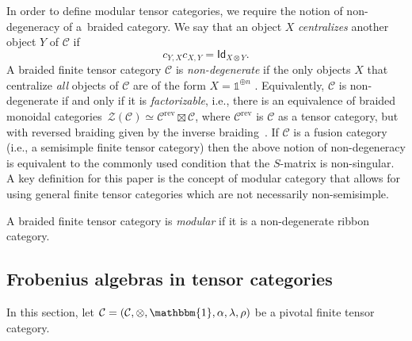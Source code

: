 \documentclass[10pt,a4paper]{amsart}
\numberwithin{equation}{section}
\newcommand{\ide}{\mathsf{Id}}
\newcommand{\one}{\mathds{1}}
\newcommand{\rev}{\mathrm{rev}}
\newcommand{\cC}{\mathcal{C}}
\newcommand{\cZ}{\mathcal{Z}}
\begin{document}
In order to define modular tensor categories, we require the notion of non-degeneracy of a~braided category. We say that an object $X$ \emph{centralizes} another object $Y$ of $\cC$ if
\[c_{Y,X}c_{X,Y}=\ide_{X\otimes Y}.\]
A braided finite tensor category $\cC$ is \emph{non-degenerate} if the only objects $X$ that centralize \emph{all} objects of $\cC$ are of the form $X=\one^{\oplus n}$ \cite[Section~8.20]{EGNO}.
Equivalently, $\cC$ is non-degenerate if and only if it is \emph{factorizable}, i.e., there is an equivalence of braided monoidal categories~$\cZ(\cC)\simeq \cC^{\rev}\boxtimes\cC$, where $\cC^\rev$ is $\cC$ as a tensor category, but with reversed braiding given by the inverse braiding~\cite{Shi1}. If $\cC$ is a fusion category (i.e., a semisimple finite tensor category) then the above notion of non-degeneracy is equivalent to the commonly used condition that the $S$-matrix is non-singular.
A key definition for this paper is the concept of modular category that allows for using general finite tensor categories which are not necessarily non-semisimple.

\begin{Definition}
A braided finite tensor category is \emph{modular} if it is a non-degenerate ribbon category.
\end{Definition}

\subsection{Frobenius algebras in tensor categories}

In this section, let $\cC=( \cC,\otimes, \mathbbm{1},\alpha,\lambda,\rho)$ be a pivotal finite tensor category.
\end{document}
